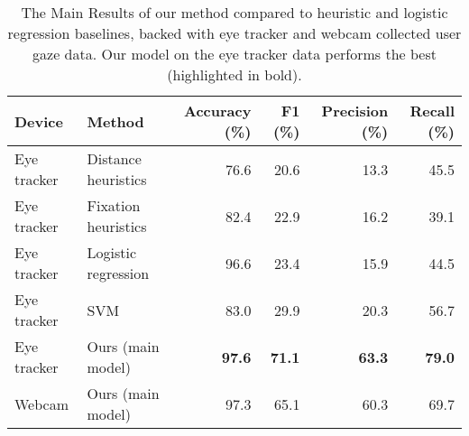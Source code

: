 \begin{table*}[]
\caption{The Main Results of our method compared to heuristic and logistic regression baselines, backed with eye tracker and webcam collected user gaze data. Our model on the eye tracker data performs the best (highlighted in bold).}
\label{tab:main-results}
\begin{tabular}{@{}llrrrr@{}}
\toprule
Device      & Method              & Accuracy (\%) & F1 (\%)   & Precision (\%) & Recall (\%) \\ \midrule
Eye tracker & Distance heuristics & 76.6     & 20.6 & 13.3      & 45.5   \\
Eye tracker & Fixation heuristics & 82.4     & 22.9 & 16.2      & 39.1   \\
Eye tracker & Logistic regression & 96.6     & 23.4 & 15.9      & 44.5   \\
Eye tracker & SVM~\cite{gaze-text_garain_2017} & 83.0 & 29.9 & 20.3 & 56.7 \\ \midrule
Eye tracker & Ours (main model)                & \textbf{97.6}     & \textbf{71.1} & \textbf{63.3}      & \textbf{79.0}   \\
Webcam      & Ours (main model)                & 97.3     & 65.1 & 60.3      & 69.7   \\ \bottomrule
\end{tabular}
\end{table*}